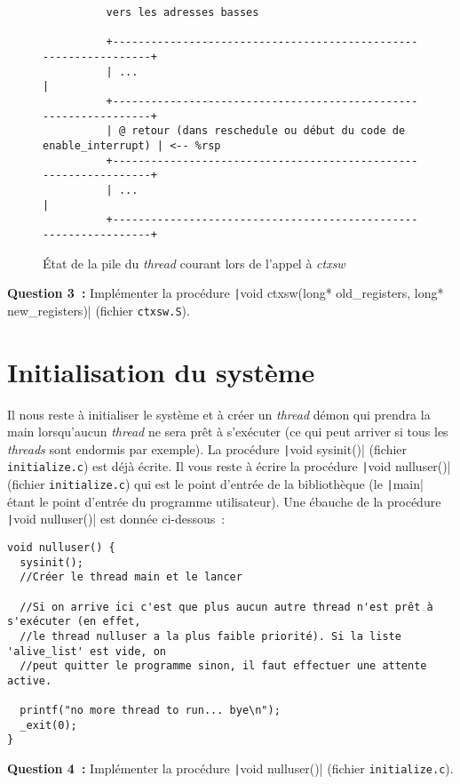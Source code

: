 \documentclass[a4paper]{article}
\begin{document}
\begin{figure}[!htpb]
\begin{center}
\begin{verbatim}
          vers les adresses basses

          +-----------------------------------------------------------------+
          | ...                                                             |
          +-----------------------------------------------------------------+
          | @ retour (dans reschedule ou début du code de enable_interrupt) | <-- %rsp
          +-----------------------------------------------------------------+
          | ...                                                             |
          +-----------------------------------------------------------------+

\end{verbatim}
\caption{\'Etat de la pile du \emph{thread} courant lors de l'appel à \emph{ctxsw}}
\label{fig:stack3}
\end{center}
\end{figure}

\textbf{Question 3~:} Implémenter la procédure \texttt|void ctxsw(long* old_registers, long* new_registers)| (fichier \verb+ctxsw.S+).

\section{Initialisation du système}

Il nous reste à initialiser le système et à créer un \emph{thread} démon qui prendra la main lorsqu'aucun \emph{thread} ne sera prêt
à s'exécuter (ce qui peut arriver si tous les \emph{threads} sont endormis par exemple). La procédure \texttt|void sysinit()| 
(fichier \verb+initialize.c+)
est déjà écrite. Il vous reste à écrire la procédure \texttt|void nulluser()| (fichier \verb+initialize.c+) qui 
est le point d'entrée de la bibliothèque (le \texttt|main| étant le point d'entrée du programme utilisateur). Une ébauche de la procédure
\texttt|void nulluser()| est donnée ci-dessous~:

\begin{verbatim}
void nulluser() {
  sysinit();
  //Créer le thread main et le lancer

  //Si on arrive ici c'est que plus aucun autre thread n'est prêt à s'exécuter (en effet,
  //le thread nulluser a la plus faible priorité). Si la liste 'alive_list' est vide, on
  //peut quitter le programme sinon, il faut effectuer une attente active.

  printf("no more thread to run... bye\n");
  _exit(0);
}
\end{verbatim}

\textbf{Question 4~:} Implémenter la procédure \texttt|void nulluser()| (fichier \verb+initialize.c+).
\end{document}
